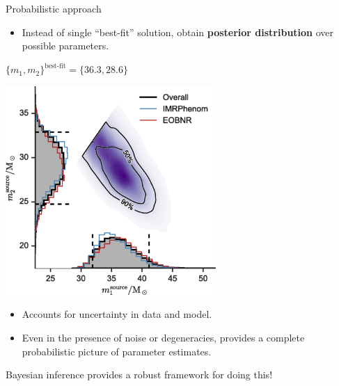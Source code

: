 \documentclass[aspectratio=169, 11pt]{beamer}
\begin{document}
\begin{frame}{Probabilistic approach}\vfill
\begin{itemize}
    \item Instead of single ``best-fit'' solution, obtain \textbf{posterior distribution} over possible parameters.
\end{itemize}
\vspace{0cm}
\begin{minipage}{0.4\textwidth}
    \centering
    $\{m_1, m_2\}^\text{best-fit} = \{36.3, 28.6\}$
\end{minipage}%
\hspace{0.25\textwidth} %
\begin{minipage}{0.3\textwidth}
    \centering
    \includegraphics[width=0.6\textwidth]{Ca_Foscari Beamer/posteriors.png}
\end{minipage}
\begin{itemize}
    \item Accounts for uncertainty in data and model.
    \item Even in the presence of noise or degeneracies, provides a complete probabilistic picture of parameter estimates.
\end{itemize}\vfill
Bayesian inference provides a robust framework for doing this!
\end{frame}
\end{document}
